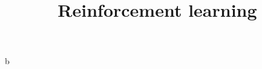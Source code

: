 \documentclass[a4paper]{article}
\title{Reinforcement learning}
\begin{document}
    \maketitle
    \tableofcontents
    \newpage
     b
    \newpage
    

 
\end{document}
